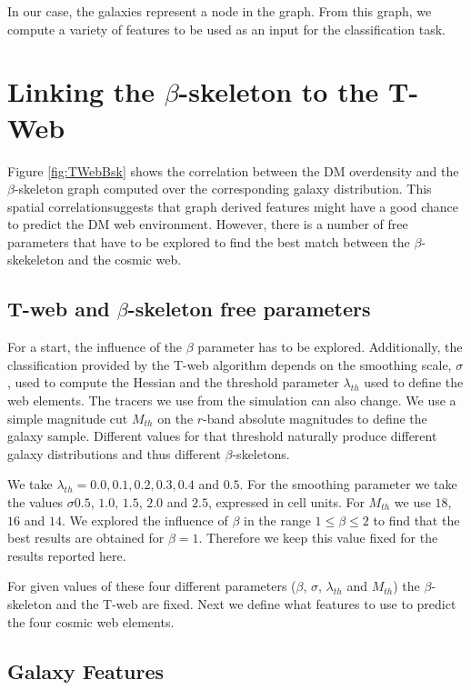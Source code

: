 \documentclass[usenatbib]{mnras}
\begin{document}
In our case, the galaxies represent a node in the graph.
From this graph, we compute a variety of features to be used as
an input for the classification task. 

\section{Linking the $\beta$-skeleton to the T-Web}\label{sec:link}

Figure \ref{fig:TWebBsk} shows the correlation between the DM overdensity
and the $\beta$-skeleton graph computed over the corresponding galaxy
distribution. 
This spatial correlationsuggests that graph derived features might have
a good chance to predict the DM web environment. 
However, there is a number of free parameters that have to be explored
to find the best match between the $\beta$-skekeleton and the cosmic
web.

\subsection{T-web and $\beta$-skeleton free parameters}

For a start, the influence of the $\beta$ parameter has to be explored.
Additionally, the classification provided by the T-web algorithm
depends on the smoothing scale, $\sigma$, used to compute the Hessian and the
threshold parameter $\lambda_{th}$ used to define the web elements.
The tracers we use from the simulation can also change. 
We use a simple magnitude cut $M_{th}$ on the $r$-band absolute magnitudes
to define the galaxy sample. 
Different values for that threshold naturally produce different galaxy
distributions and thus different $\beta$-skeletons. 

We take $\lambda_{th}=0.0, 0.1, 0.2, 0.3, 0.4$ and $0.5$.
For the smoothing parameter we take the values $\sigma 0.5$, $1.0$,
$1.5$, $2.0$ and $2.5$, expressed in cell units.
For $M_{th}$ we use  $18$, $16$ and $14$. 
We explored the influence of $\beta$ in the range $1\leq \beta \leq 2$
to find that the best results are obtained for $\beta=1$. 
Therefore we keep this value fixed for the results reported here.

For given values of these four different parameters ($\beta$,
$\sigma$, $\lambda_{th}$ and $M_{th}$) the $\beta$-skeleton and the
T-web are fixed.
Next we define what features to use to predict the four cosmic web
elements. 



\subsection{Galaxy Features}
\end{document}
